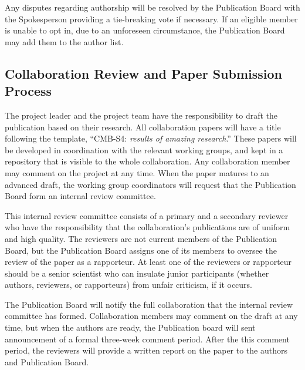 Any disputes regarding authorship will be resolved by the Publication Board with the Spokesperson providing a tie-breaking vote if necessary.  If an eligible member is unable to opt in, due to an unforeseen circumstance, the Publication Board may add them to the author list.

\subsection{Collaboration Review and Paper Submission Process}
 
The project leader and the project team have the responsibility to draft the publication based on their research.  All collaboration papers will have a title following the template, ``CMB-S4: \textit{results of amazing research}.''  These papers will be developed in coordination with the relevant working groups, and kept in a repository that is visible to the whole collaboration.  Any collaboration member may comment on the project at any time.  When the paper matures to an advanced draft, the working group coordinators will request that the Publication Board form an internal review committee.  

This internal review committee consists of a primary and a secondary reviewer who have the responsibility that the collaboration's publications are of uniform and high quality.  The reviewers are not current members of the Publication Board, but the Publication Board assigns one of its members to oversee the review of the paper as a rapporteur.  At least one of the reviewers or rapporteur should be a senior scientist who can insulate junior participants (whether authors, reviewers, or rapporteurs) from unfair criticism, if it occurs.

The Publication Board will notify the full collaboration that the internal review committee has formed.  Collaboration members may comment on the draft at any time, but when the authors are ready, the Publication board will sent announcement of a formal three-week comment period.  After the this comment period, the reviewers will provide a written report on the paper to the authors and Publication Board.

